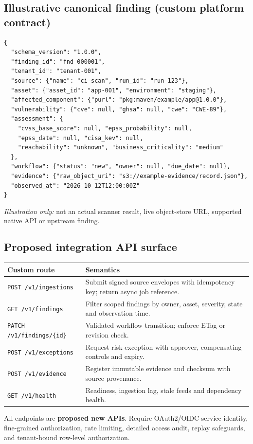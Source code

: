 \documentclass[11pt,oneside]{report}
\begin{document}
\subsection{Illustrative canonical finding (custom platform contract)}
\begin{verbatim}
{
  "schema_version": "1.0.0",
  "finding_id": "fnd-000001",
  "tenant_id": "tenant-001",
  "source": {"name": "ci-scan", "run_id": "run-123"},
  "asset": {"asset_id": "app-001", "environment": "staging"},
  "affected_component": {"purl": "pkg:maven/example/app@1.0.0"},
  "vulnerability": {"cve": null, "ghsa": null, "cwe": "CWE-89"},
  "assessment": {
    "cvss_base_score": null, "epss_probability": null,
    "epss_date": null, "cisa_kev": null,
    "reachability": "unknown", "business_criticality": "medium"
  },
  "workflow": {"status": "new", "owner": null, "due_date": null},
  "evidence": {"raw_object_uri": "s3://example-evidence/record.json"},
  "observed_at": "2026-10-12T12:00:00Z"
}
\end{verbatim}
\textit{Illustration only:} not an actual scanner result, live object-store URL, supported native API or upstream finding.

\subsection{Proposed integration API surface}

\noindent\begin{tabularx}{\textwidth}{P{0.31\textwidth}Y}
\toprule Custom route & Semantics\\\midrule
\texttt{POST /v1/ingestions} & Submit signed source envelopes with idempotency key; return async job reference.\\
\texttt{GET /v1/findings} & Filter scoped findings by owner, asset, severity, state and observation time.\\
\texttt{PATCH /v1/findings/\{id\}} & Validated workflow transition; enforce ETag or revision check.\\
\texttt{POST /v1/exceptions} & Request risk exception with approver, compensating controls and expiry.\\
\texttt{POST /v1/evidence} & Register immutable evidence and checksum with source provenance.\\
\texttt{GET /v1/health} & Readiness, ingestion lag, stale feeds and dependency health.\\
\bottomrule
\end{tabularx}
All endpoints are \textbf{proposed new APIs}. Require OAuth2/OIDC service identity, fine-grained authorization, rate limiting, detailed access audit, replay safeguards, and tenant-bound row-level authorization.
\end{document}
